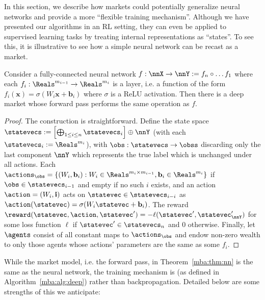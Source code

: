 

In this section, we describe how markets could potentially generalize neural networks and provide a more ``flexible training mechanism''. Although we have presented our algorithms in an RL setting, they can even be applied to supervised learning tasks by treating internal representations as ``states''. To see this, it is illustrative to see how a simple neural network can be recast as a market.

\begin{theorem}
  Consider a fully-connected neural network $f:\nnX\to\nnY:=f_n\circ\dots f_1$ where each $f_i:\Reals^{m_{i-1}}\to\Reals^{m_i}$ is a layer, i.e. a function of the form $f_i(\mathbf{x})=\sigma(W_i\mathbf{x}+\mathbf{b}_i)$ where $\sigma$ is a ReLU activation. Then there is a deep market whose forward pass performs the same operation as $f$.
  \label{mba:thm:nn}
\end{theorem}
\begin{proof}
  The construction is straightforward. Define the state space $\statevecs:=\left[\bigoplus_{1\le i\le n}\statevecs_i\right]\oplus\nnY$ (with each $\statevecs_i:=\Reals^{m_i}$), with $\obs:\statevecs\to\obss$ discarding only the last component $\nnY$ which represents the true label which is unchanged under all actions. Each $\actions_{\obs}=\{(W_i,\mathbf{b}_i):W_i\in\Reals^{m_i\times m_{i-1}}, \mathbf{b}_i\in\Reals^{m_i}\}$ if $\obs\in\statevecs_{i-1}$ and empty if no such $i$ exists, and an action $\action=(W_i,\mathbf{i})$ acts on $\statevec\in\statevecs_{i-i}$ as $\action(\statevec)=\sigma(W_i\statevec+\mathbf{b}_i)$. The reward $\reward(\statevec,\action,\statevec')=-\ell(\statevec',\statevec'_{\nnY})$ for some loss function $\ell$ if $\statevec'\in\statevecs_n$ and $0$ otherwise. Finally, let $\agents$ consist of all constant maps to $\actions_\obs$ and endow non-zero wealth to only those agents whose actions' parameters are the same as some $f_i$.
\end{proof}

While the market model, i.e. the forward pass, in Theorem~\ref{mba:thm:nn} is the same as the neural network, the training mechanism is  (as defined in Algorithm~\ref{mba:alg:deep}) rather than backpropagation. Detailed below are some strengths of this we anticipate:

